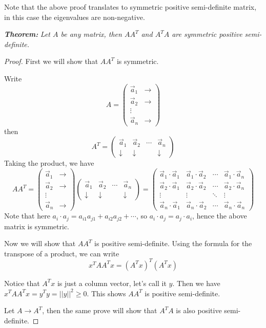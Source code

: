 \documentclass{article}
\begin{document}
Note that the above proof translates to symmetric positive semi-definite matrix, in this case the eigenvalues are non-negative.
\bigskip

\textit{\textbf{Theorem:}} \textit{Let $A$ be any matrix, then $AA^T$ and $A^TA$ are symmetric positive semi-definite.}

\begin{proof}
First we will show that $AA^T$ is symmetric.

Write $$A = \begin{pmatrix} \vec{a}_1  & \rightarrow \\
\vec{a}_2 & \rightarrow \\ \vdots \\ \vec{a}_n & \rightarrow\end{pmatrix} $$
then $$A^T = \begin{pmatrix} \vec{a}_{1} & \vec{a}_{2}  & \cdots  &\vec{a}_n\\
\downarrow &\downarrow  &  & \downarrow \end{pmatrix} $$
Taking the product, we have
$$ A A^T = \begin{pmatrix} \vec{a}_1  & \rightarrow \\
\vec{a}_2 & \rightarrow \\ \vdots \\ \vec{a}_n & \rightarrow\end{pmatrix}  \begin{pmatrix} \vec{a}_{1} & \vec{a}_{2}  & \cdots  &\vec{a}_n\\
\downarrow &\downarrow  &  & \downarrow \end{pmatrix} = \begin{pmatrix} \vec{a}_1 \cdot \vec{a}_1 & \vec{a}_1 \cdot \vec{a}_2  & \cdots & \vec{a}_1 \cdot \vec{a}_n\\ \vec{a}_2 \cdot \vec{a}_1 & \vec{a}_2 \cdot \vec{a}_2 & \cdots &\vec{a}_2 \cdot \vec{a}_n \\
\vdots& \vdots & \ddots & \vdots \\
\vec{a}_n \cdot \vec{a}_1 & \vec{a}_n \cdot \vec{a}_2 & \cdots & \vec{a} _n \cdot \vec{a}_n \end{pmatrix} 
$$
Note that here $a_i \cdot a_j = a_{i1}a_{j1} + a_{i2}a_{j2} + \cdots$, so $a_i \cdot a_j = a_j \cdot a_i$, hence the above matrix is symmetric.

Now we will show that $AA^T$ is positive semi-definite. Using the formula for the transpose of a product, we can write
$$x^T AA^T x = (A^Tx)^T (A^Tx) $$

Notice that $A^Tx$ is just a column vector, let's call it $y$. Then we have $x^T AA^T x = y^T y = ||y||^2 \ge 0$. This shows $AA^T$ is positive semi-definite. 

Let $A \rightarrow A^T$, then the same prove will show that $A^TA$ is also positive semi-definite.
\end{proof}
\bigskip
\end{document}
